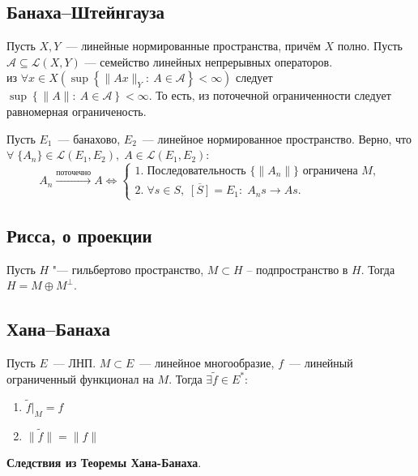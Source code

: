 
\subsection{Банаха--Штейнгауза}

\begin{theorem}\label{Banach-Steingaus}
Пусть \(X, Y\)~--- линейные нормированные пространства, причём \(X\) полно. Пусть \(\mathcal{A} \subseteq \mathcal{L}(X, Y)\) --- семейство линейных непрерывных операторов.\\
 из \(\forall x \in X \left(\sup\left\{\|Ax\|_Y:\: A \in \mathcal{A} \right\} < \infty \right)\) следует \(\sup\left\{\|A\|:\: A \in \mathcal{A} \right\} < \infty\). То есть, из поточечной ограниченности следует равномерная ограниченость.
\end{theorem}

\begin{theorem}
\label{bshetengcorollary}
    Пусть $E_1$~--- банахово, $E_2$~--- линейное нормированное пространство. Верно, что $\forall\; \{A_n\} \in \mathcal{L}(E_1, E_2),\; A \in \mathcal{L}(E_1, E_2)$:
    \[
    A_n \xrightarrow{\textit{поточечно}} A \Leftrightarrow
    \begin{cases}
        1.\;\text{Последовательность }\{\|A_n\|\}\text{ ограничена } M,\\
        2.\;\forall s \in S, \; \overline{[S]} = E_1: \; A_n s \to As.
    \end{cases}
    \]
\end{theorem}

\subsection{Рисса, о проекции}
\begin{theorem}\label{thm4.3}
    Пусть $H$ "--- гильбертово пространство, {$M \subset H$} -- подпространство в $H$. Тогда $H = M \oplus M^\perp$.
\end{theorem}

\subsection{Хана--Банаха}

\begin{theorem}\label{Han-Banah}
Пусть $E$~--- ЛНП. $M \subset E$~--- линейное многообразие, $f$~--- линейный ограниченный функционал на $M$. Тогда $\exists \widetilde{f} \in E^*$:
\begin{enumerate}
    \item  $ \widetilde{f} |_{M} = f$
    \item \(\| \widetilde{f} \| = \|f\|\)
\end{enumerate}
\end{theorem}
\noindent\textbf{Следствия из Теоремы Хана-Банаха}.

